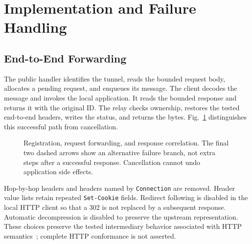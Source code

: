 \documentclass[conference,letterpaper]{IEEEtran}
\newcommand{\code}[1]{\texttt{#1}}
\begin{document}
\section{Implementation and Failure Handling}
\subsection{End-to-End Forwarding}
The public handler identifies the tunnel, reads the bounded request body,
allocates a pending request, and enqueues its message. The client decodes the
message and invokes the local application. It reads the bounded response and
returns it with the original ID. The relay checks ownership, restores the
tested end-to-end headers, writes the status, and returns the bytes.
Fig.~\ref{fig:sequence} distinguishes this successful path from cancellation.

\begin{figure}[!t]
\centering
{}
\caption{Registration, request forwarding, and response correlation. The final
two dashed arrows show an alternative failure branch, not extra steps after a
successful response. Cancellation cannot undo application side effects.}
\label{fig:sequence}
\end{figure}

Hop-by-hop headers and headers named by \code{Connection} are removed. Header
value lists retain repeated \code{Set-Cookie} fields. Redirect following is
disabled in the local HTTP client so that a 302 is not replaced by a subsequent
response. Automatic decompression is disabled to preserve the upstream
representation. These choices preserve the tested intermediary behavior
associated with HTTP semantics~\cite{http}; complete HTTP conformance is not
asserted.
\end{document}

